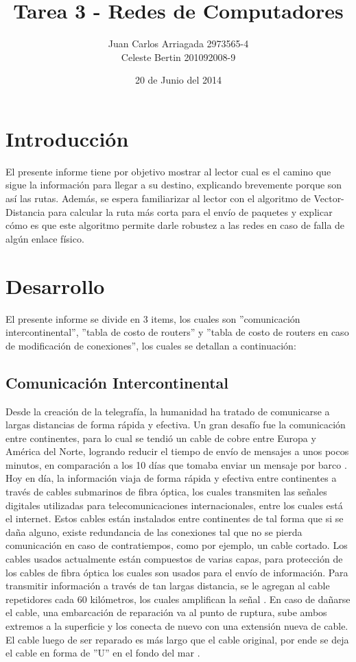 \documentclass{article}
\title{Tarea 3 - Redes de Computadores}
\author{Juan Carlos Arriagada 2973565-4\\Celeste Bertin 201092008-9}
\date{20 de Junio del 2014}
\begin{document}
\maketitle

\section{Introducción}
El presente informe tiene por objetivo mostrar al lector cual es el camino que sigue la información para llegar a su destino, explicando brevemente porque son así las rutas. Además, se espera familiarizar al lector con el algoritmo de Vector-Distancia para calcular la ruta más corta para el envío de paquetes  y explicar cómo es que este algoritmo permite darle robustez a las redes en caso de falla de algún enlace físico.

\section{Desarrollo}
El presente informe se divide en 3 items, los cuales son ''comunicación intercontinental'', ''tabla de costo de routers'' y ''tabla de costo de routers en caso de modificación de conexiones'', los cuales se detallan a continuación:
\subsection{Comunicación Intercontinental}
Desde la creación de la telegrafía, la humanidad ha tratado de comunicarse a largas distancias de forma rápida y efectiva. Un gran desafío fue la comunicación entre continentes, para lo cual se tendió un cable de cobre entre Europa y América del Norte, logrando reducir el tiempo de envío de mensajes a unos pocos minutos, en comparación a los 10 días que tomaba enviar un mensaje por barco \citep{website:galido}. 
Hoy en día, la información viaja de forma rápida y efectiva entre continentes a través de cables submarinos de fibra óptica, los cuales transmiten las señales digitales utilizadas para telecomunicaciones internacionales, entre los cuales está el internet. Estos cables están instalados entre continentes de tal forma que si se daña alguno, existe redundancia de las conexiones tal que no se pierda comunicación en caso de contratiempos, como por ejemplo, un cable cortado. Los cables usados actualmente están compuestos de varias capas, para protección de los cables de fibra óptica los cuales son usados para el envío de información. Para transmitir información a través de tan largas distancia, se le agregan al cable repetidores cada 60 kilómetros, los cuales amplifican la señal \citep{website:cablestransoceanicos}.
En caso de dañarse el cable, una embarcación de reparación va al punto de ruptura, sube ambos extremos a la superficie y los conecta de nuevo con una extensión nueva de cable. El cable luego de ser reparado es más largo que el cable original, por ende se deja el cable en forma de ''U'' en el fondo del mar \citep{website:repair}.
\end{document}
